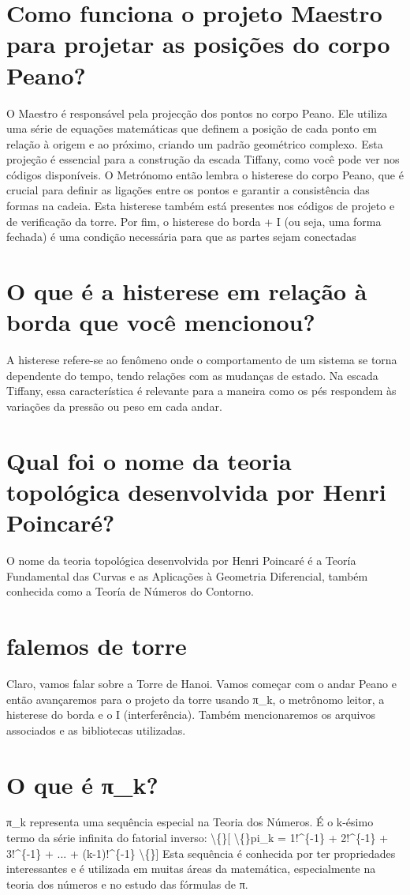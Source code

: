 \documentclass[11pt,a4paper]{article}
\begin{document}
\section{Como funciona o projeto Maestro para projetar as posições do corpo Peano?}
O Maestro é responsável pela projecção dos pontos no corpo Peano. Ele utiliza uma série de equações matemáticas que definem a posição de cada ponto em relação à origem e ao próximo, criando um padrão geométrico complexo. Esta projeção é essencial para a construção da escada Tiffany, como você pode ver nos códigos disponíveis. O Metrónomo então lembra o histerese do corpo Peano, que é crucial para definir as ligações entre os pontos e garantir a consistência das formas na cadeia. Esta histerese também está presentes nos códigos de projeto e de verificação da torre. Por fim, o histerese do borda + I (ou seja, uma forma fechada) é uma condição necessária para que as partes sejam conectadas

\section{O que é a histerese em relação à borda que você mencionou?}
A histerese refere-se ao fenômeno onde o comportamento de um sistema se torna dependente do tempo, tendo relações com as mudanças de estado. Na escada Tiffany, essa característica é relevante para a maneira como os pés respondem às variações da pressão ou peso em cada andar.

\section{Qual foi o nome da teoria topológica desenvolvida por Henri Poincaré?}
O nome da teoria topológica desenvolvida por Henri Poincaré é a Teoría Fundamental das Curvas e as Aplicações à Geometria Diferencial, também conhecida como a Teoría de Números do Contorno.

\section{falemos de torre}
Claro, vamos falar sobre a Torre de Hanoi. Vamos começar com o andar Peano e então avançaremos para o projeto da torre usando π\_k, o metrônomo leitor, a histerese do borda e o I (interferência). Também mencionaremos os arquivos associados e as bibliotecas utilizadas.

\section{O que é π\_k?}
π\_k representa uma sequência especial na Teoria dos Números. É o k-ésimo termo da série infinita do fatorial inverso: \textbackslash\{\}[ \textbackslash\{\}pi\_k = 1!^\{-1\} + 2!^\{-1\} + 3!^\{-1\} + ... + (k-1)!^\{-1\} \textbackslash\{\}] Esta sequência é conhecida por ter propriedades interessantes e é utilizada em muitas áreas da matemática, especialmente na teoria dos números e no estudo das fórmulas de π.
\end{document}
